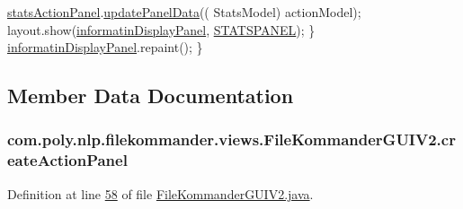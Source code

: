 \begin{DoxyCode}
            \hyperlink{classcom_1_1poly_1_1nlp_1_1filekommander_1_1views_1_1_file_kommander_g_u_i_v2_a4a8dcb03bd747de3c01531e30bfb5849}{statsActionPanel}.\hyperlink{classcom_1_1poly_1_1nlp_1_1filekommander_1_1views_1_1panels_1_1_stats_action_panel_a3feebd3516f922f6dfb69a2b20dd49cc}{updatePanelData}((
      StatsModel) actionModel);
            layout.show(\hyperlink{classcom_1_1poly_1_1nlp_1_1filekommander_1_1views_1_1_file_kommander_g_u_i_v2_ac0e47bc8b5d4f38b43baae6b72778c1f}{informatinDisplayPanel}, \hyperlink{classcom_1_1poly_1_1nlp_1_1filekommander_1_1views_1_1_file_kommander_g_u_i_v2_aff9a87dc378944cb3ab200905c962ef8}{
      STATSPANEL});
        \}
        \hyperlink{classcom_1_1poly_1_1nlp_1_1filekommander_1_1views_1_1_file_kommander_g_u_i_v2_ac0e47bc8b5d4f38b43baae6b72778c1f}{informatinDisplayPanel}.repaint();
    \}
\end{DoxyCode}


\subsection{Member Data Documentation}
\hypertarget{classcom_1_1poly_1_1nlp_1_1filekommander_1_1views_1_1_file_kommander_g_u_i_v2_a1838b8ff89c4457f8df1209e48f9e474}{
\subsubsection[{create\-Action\-Panel}]{ com.\-poly.\-nlp.\-filekommander.\-views.\-File\-Kommander\-G\-U\-I\-V2.\-create\-Action\-Panel\hspace{0.3cm}{\ttfamily [private]}}}\label{classcom_1_1poly_1_1nlp_1_1filekommander_1_1views_1_1_file_kommander_g_u_i_v2_a1838b8ff89c4457f8df1209e48f9e474}


Definition at line \hyperlink{L58}{58} of file \hyperlink{}{File\-Kommander\-G\-U\-I\-V2.\-java}.

